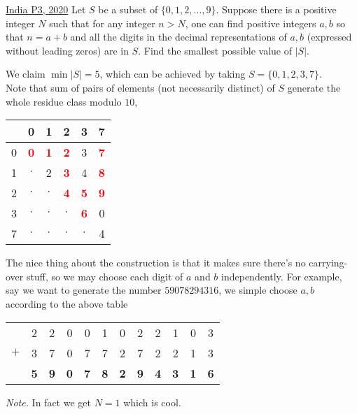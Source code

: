 \begin{problem}{3}{\href{https://artofproblemsolving.com/community/c6h1989008p34732913}{India P3, 2020}}
	Let $S$ be a subset of $\{0,1,2,\dots ,9\}$. Suppose there is a positive integer $N$ such that for any integer $n>N$, one can find positive integers $a,b$ so that $n=a+b$ and all the digits in the decimal representations of $a,b$ (expressed without leading zeros) are in $S$. Find the smallest possible value of $|S|$.
	\begin{solution} We claim $\min |S|=5$, which can be achieved by taking $S=\{0,1,2,3,7\}$.\\

	 Note that sum of pairs of elements (not necessarily distinct) of $S$ generate the whole residue class modulo $10$,
	\begin{center}\begin{tabular}{c| c c  c c c}
& 0 & 1 & 2 & 3 & 7\\
\hline
0 & \textcolor{red}{\textbf{0}} & \textcolor{red}{\textbf{1}} & \textcolor{red}{\textbf{2}} & 3 & \textcolor{red}{\textbf{7}}\\ 
1 & $\cdot$ & 2 & \textcolor{red}{\textbf{3}} & 4 & \textcolor{red}{\textbf{8}}\\ 
2 & $\cdot$ & $\cdot$ & \textcolor{red}{\textbf{4}} & \textcolor{red}{\textbf{5}} & \textcolor{red}{\textbf{9}}\\ 
3 & $\cdot$ & $\cdot$ & $\cdot$ & \textcolor{red}{\textbf{6}} & 0\\ 
7 & $\cdot$ & $\cdot$ & $\cdot$ & $\cdot$ & 4\\ 
\end{tabular}\end{center}
	\indent The nice thing about the construction is that it makes sure there's no carrying-over stuff, so we may choose each digit of $a$ and $b$ independently. For example, say we want to generate the number $59078294316$, we simple choose $a,b$ according to the above table
	\begin{center}\begin{tabular}{c c c c c c c c c c c c}
        & 2 & 2 & 0 & 0 & 1 & 0 & 2 & 2 & 1 & 0 & 3\\
$+$ & 3 & 7 & 0 & 7 & 7 & 2 & 7 & 2 & 2 & 1 & 3\\
\hline
& \textbf{5} & \textbf{9} & \textbf{0} & \textbf{7} & \textbf{8} & \textbf{2} & \textbf{9} & \textbf{4} & \textbf{3} & \textbf{1} & \textbf{6}
\end{tabular}\end{center}
	\noindent \emph{Note.} In fact we get $N=1$ which is cool.\\


\end{solution}
\end{problem}
